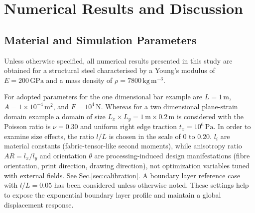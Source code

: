 \documentclass[final,3p,times,fleqn]{elsarticle}
\newcommand{\rev}[1]{\textcolor{revcolor}{#1}}
\begin{document}
\section{Numerical Results and Discussion}
\label{sec:numerical_results}


\subsection{Material and Simulation Parameters}
\label{sec:materials}

Unless otherwise specified, all numerical results presented in this
study are obtained for a structural steel characterised by a Young's
modulus of $E = 200\,\mathrm{GPa}$ and a mass density of
$\rho = 7800\,\mathrm{kg\,m^{-3}}$.

For adopted parameters for the one dimensional bar example are $L = 1\,\mathrm{m}$, $A = 1\times10^{-4}\,\mathrm{m^{2}}$, and
$F = 10^{4}\,\mathrm{N}$. Whereas for a two dimensional plane-strain domain example a domain of size $L_{x}\times L_{y} = 1\,\mathrm{m}\times 0.2\,\mathrm{m}$ is considered with the Poisson
ratio is $\nu = 0.30$ and uniform right edge traction 
$t_{x} = 10^{6}\,\mathrm{Pa}$. In order to examine size effects, the ratio $l/L$ is chosen in the scale of $0$ to $0.20$. \rev{$l_i$ are material constants (fabric-tensor-like second moments), while anisotropy ratio $AR=l_x/l_y$ and orientation $\theta$ are processing-induced design manifestations (fibre orientation, print direction, drawing direction), not optimization variables tuned with external fields. See Sec.\ref{sec:calibration}.} A boundary layer reference case with $l/L=0.05$ has been considered unless otherwise noted. These settings help to expose the exponential boundary layer profile and maintain a global displacement response. 



\end{document}
